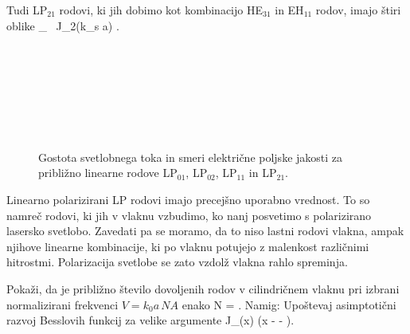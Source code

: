 Tudi LP$_{21}$ rodovi, ki jih dobimo kot kombinacijo HE$_{31}$
in EH$_{11}$ rodov, imajo štiri oblike
\beq
{}_  \, J_2(k_s a)
{ \varphi \brace {}\varphi}.
\eeq
\begin{figure}[h!]
\centering
\def\svgwidth{93truemm} 
 \\
\def\svgwidth{93truemm} 
 \\
\def\svgwidth{93truemm} 
 \\
\def\svgwidth{93truemm} 
 \\
\def\svgwidth{93truemm} 
 \\
\def\svgwidth{93truemm} 
 \\
\caption{Gostota svetlobnega toka in smeri električne poljske jakosti za približno linearne rodove
LP$_{01}$, LP$_{02}$, LP$_{11}$ in LP$_{21}$.}
\label{fig:LP}
\end{figure}
Linearno polarizirani LP rodovi imajo precejšno uporabno vrednost. To so 
namreč rodovi, ki jih v vlaknu vzbudimo, ko nanj posvetimo s polarizirano 
lasersko svetlobo. Zavedati pa se moramo, da to niso lastni rodovi vlakna, 
ampak njihove linearne kombinacije, ki po vlaknu potujejo z malenkost različnimi
hitrostmi. Polarizacija svetlobe se zato vzdolž vlakna rahlo spreminja.

\begin{definition}
Pokaži, da je približno število dovoljenih rodov v cilindričnem vlaknu pri 
izbrani normalizirani frekvenci $V = k_0a\, NA $ enako
\beq 
N = .
\eeq
Namig: Upoštevaj asimptotični razvoj Besslovih funkcij za velike argumente
\beq
J_\nu(x) \approx {}\cos\left(x - - \right).
\eeq
\end{definition}

